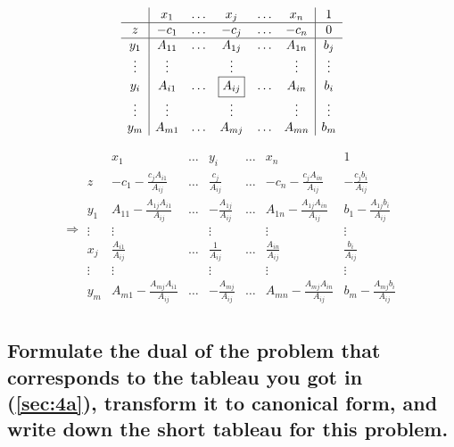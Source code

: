 \documentclass[12pt, a4]{article}
\begin{document}
{\begin{equation}
	\begin{array}{c|ccccc|c}
		& x_1 & \ldots & x_j & \ldots & x_n & 1 \\
		\hline
		z & -c_1 & \ldots & -c_j & \ldots & -c_n & 0 \\
		\hline
		y_1 & A_{11} & \ldots & A_{1j} & \ldots & A_{1n} & b_j \\
		\vdots & \vdots && \vdots & & \vdots & \vdots \\
		y_i & A_{i1} & \ldots & \fbox{$A_{ij}$} & \ldots & A_{in} & b_i \\
		\vdots & \vdots && \vdots & & \vdots & \vdots \\
		y_m & A_{m1} & \ldots & A_{mj} & \ldots & A_{mn} & b_m \\
	\end{array}
	\label{eq:p_1_short_tableau}
\end{equation}


\begin{equation}
	\Rightarrow
	\begin{array}{c|ccccc||c}
		& x_1 & \ldots & y_i & \ldots & x_n & 1 \\
		\hline
		z & -c_1-\frac{c_jA_{i1}}{A_{ij}} & \ldots & \frac{c_j}{A_{ij}} & \ldots & -c_n-\frac{c_jA_{in}}{A_{ij}} & -\frac{c_jb_i}{A_{ij}} \\
		\hline
		y_1 & A_{11}-\frac{A_{1j}A_{i1}}{A_{ij}} & \ldots & -\frac{A_{1j}}{A_{ij}} & \ldots & A_{1n}-\frac{A_{1j}A_{in}}{A_{ij}} & b_1-\frac{A_{1j}b_{i}}{A_{ij}} \\
		\vdots & \vdots && \vdots & & \vdots & \vdots \\
		x_j & \frac{A_{i1}}{A_{ij}} & \ldots & \frac{1}{A_{ij}} & \ldots & \frac{A_{in}}{A_{ij}} & \frac{b_i}{A_{ij}} \\
		\vdots & \vdots && \vdots & & \vdots & \vdots \\
		y_m & A_{m1}-\frac{A_{mj}A_{i1}}{A_{ij}} & \ldots & -\frac{A_{mj}}{A_{ij}} & \ldots & A_{mn}-\frac{A_{mj}A_{in}}{A_{ij}} & b_m - \frac{A_{mj}b_{i}}{A_{ij}} \\
	\end{array}
	\label{eq:p_1_short_tableau_pivoted}
\end{equation}

\subsection{Formulate the dual of the problem that corresponds to the tableau you got in (\ref{sec:4a}), transform it to canonical form, and write down the short tableau for this problem.}{\label{sec:4b}}

}
\end{document}
